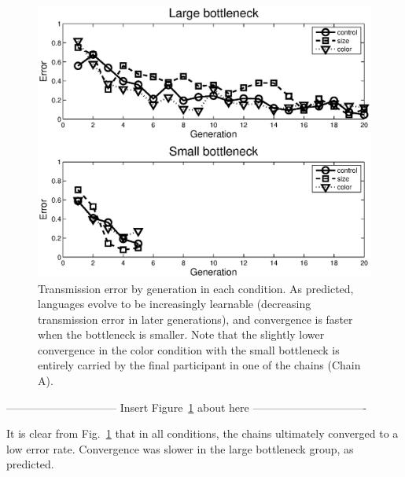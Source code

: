 \documentclass{apa}
\begin{document}
\begin{figure}
\begin{center}
\includegraphics[scale=0.5]{convergence.eps}
\end{center}
\vspace{-5mm}
\caption{Transmission error by generation in each condition. As predicted, languages evolve to be increasingly learnable (decreasing transmission error in later generations),  and convergence is faster when the bottleneck is smaller. Note that the slightly lower convergence in the {\sc color} condition with the {\sc small} bottleneck is entirely carried by the final participant in one of the chains (Chain A).}
\label{fig:convergence}
\end{figure}

\vspace{5mm}
------------------------------ Insert Figure~\ref{fig:convergence} about here -------------------------------
\vspace{5mm}


 It is clear from Fig.~\ref{fig:convergence} that in all conditions, the chains ultimately converged to a low error rate. Convergence was slower in the {\sc large} bottleneck group, as predicted.
\end{document}
